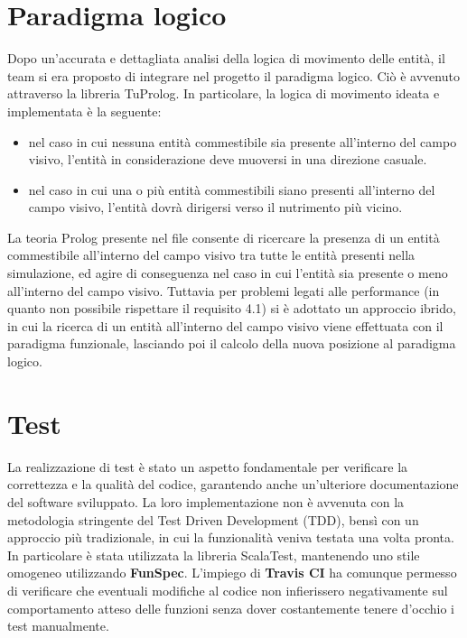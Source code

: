 \section{Paradigma logico}
Dopo un'accurata e dettagliata analisi della logica di movimento delle entità, il team si era proposto di integrare nel progetto il paradigma logico. Ciò è avvenuto attraverso la libreria TuProlog. In particolare, la logica di movimento ideata e implementata è la seguente:
\begin{itemize}
    \item nel caso in cui nessuna entità commestibile sia presente all'interno del campo visivo, l'entità in considerazione deve muoversi in una direzione casuale.
    \item nel caso in cui una o più entità commestibili siano presenti all'interno del campo visivo, l'entità dovrà dirigersi verso il nutrimento più vicino.
\end{itemize}
La teoria Prolog presente nel file  consente di ricercare la presenza di un entità commestibile all'interno del campo visivo tra tutte le entità presenti nella simulazione, ed agire di conseguenza nel caso in cui l'entità sia presente o meno all'interno del campo visivo. Tuttavia per problemi legati alle performance (in quanto non possibile rispettare il requisito 4.1) si è adottato un approccio ibrido, in cui la ricerca di un entità all'interno del campo visivo viene effettuata con il paradigma funzionale, lasciando poi il calcolo della nuova posizione al paradigma logico.

\section{Test}
La realizzazione di test è stato un aspetto fondamentale per verificare la correttezza e la qualità del codice, garantendo anche un'ulteriore documentazione del software sviluppato. La loro implementazione non è avvenuta con la metodologia stringente del Test Driven Development (TDD), bensì con un approccio più tradizionale, in cui la funzionalità veniva testata una volta pronta. In particolare è stata utilizzata la libreria ScalaTest, mantenendo uno stile omogeneo utilizzando \textbf{FunSpec}. L'impiego di \textbf{Travis CI} ha comunque permesso di verificare che eventuali modifiche al codice non infierissero negativamente sul comportamento atteso delle funzioni senza dover costantemente tenere d'occhio i test manualmente.

